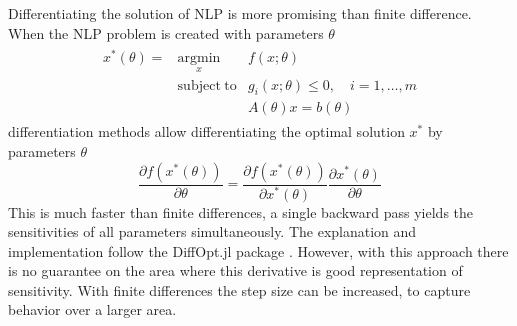 Differentiating the solution of NLP is more promising than finite difference. When the NLP problem is created with parameters $\theta$
\begin{equation}
\begin{split}
\begin{array} {lll}
x^*(\theta)=& {\underset {x}{\operatorname {argmin} }}& f(x; \theta)\\
            &  \operatorname {subject\;to} & g_{i}(x; \theta)\leq 0,\quad i=1,\dots ,m\\
            &                              & A(\theta) x = b(\theta)
\end{array}
\end{split}  
\end{equation}
differentiation methods allow differentiating the optimal solution $x^*$ by parameters $\theta$
\begin{equation}
  \frac{\partial f(x^*(\theta))}{\partial \theta} = \frac{\partial f(x^*(\theta))}{\partial x^*(\theta)}  \frac{\partial x^*(\theta)}{\partial \theta}
\end{equation}
This is much faster than finite differences, a single backward pass yields the sensitivities of all parameters simultaneously. The explanation and implementation follow the DiffOpt.jl package \cite{besancon2023diffopt}. However, with this approach there is no guarantee on the area where this derivative is good representation of sensitivity. With finite differences the step size can be increased, to capture behavior over a larger area.


